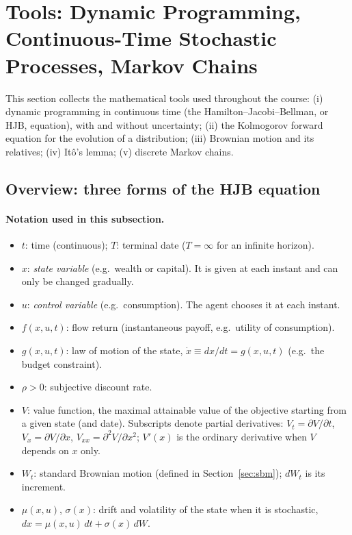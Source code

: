 \section{Tools: Dynamic Programming, Continuous-Time Stochastic Processes, Markov Chains}

This section collects the mathematical tools used throughout the course: (i) dynamic programming in continuous time (the Hamilton--Jacobi--Bellman, or HJB, equation), with and without uncertainty; (ii) the Kolmogorov forward equation for the evolution of a distribution; (iii) Brownian motion and its relatives; (iv) It\^o's lemma; (v) discrete Markov chains.

\subsection{Overview: three forms of the HJB equation }

\paragraph{Notation used in this subsection.}
\begin{itemize}
\item $t$: time (continuous); $T$: terminal date ($T=\infty$ for an infinite horizon).
\item $x$: \emph{state variable} (e.g.\ wealth or capital). It is given at each instant and can only be changed gradually.
\item $u$: \emph{control variable} (e.g.\ consumption). The agent chooses it at each instant.
\item $f(x,u,t)$: flow return (instantaneous payoff, e.g.\ utility of consumption).
\item $g(x,u,t)$: law of motion of the state, $\dot x\equiv dx/dt=g(x,u,t)$ (e.g.\ the budget constraint).
\item $\rho>0$: subjective discount rate.
\item $V$: value function, the maximal attainable value of the objective starting from a given state (and date). Subscripts denote partial derivatives: $V_t=\partial V/\partial t$, $V_x=\partial V/\partial x$, $V_{xx}=\partial^2V/\partial x^2$; $V'(x)$ is the ordinary derivative when $V$ depends on $x$ only.
\item $W_t$: standard Brownian motion (defined in Section~\ref{sec:sbm}); $dW_t$ is its increment.
\item $\mu(x,u)$, $\sigma(x)$: drift and volatility of the state when it is stochastic, $dx=\mu(x,u)\,dt+\sigma(x)\,dW$.
\end{itemize}

